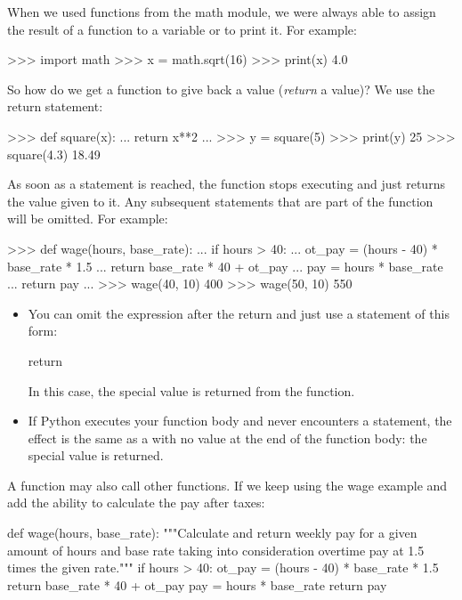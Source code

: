 \documentclass[11pt]{cselabheader}
\begin{document}
{When we used functions from the math module, we were always able to assign the
result of a function to a variable or to print it. For example:

\begin{pyconcode}
>>> import math
>>> x = math.sqrt(16)
>>> print(x)
4.0
\end{pyconcode}

So how do we get a function to give back a value (\emph{return} a value)? We use
the return statement:

\begin{pyconcode}
>>> def square(x):
...     return x**2
...
>>> y = square(5)
>>> print(y)
25
>>> square(4.3)
18.49
\end{pyconcode}

As soon as a  statement is reached, the function stops
executing and just returns the value given to it. Any subsequent statements that
are part of the function will be omitted. For example:

\begin{pyconcode}
>>> def wage(hours, base_rate):
...     if hours > 40:
...         ot_pay = (hours - 40) * base_rate * 1.5
...         return base_rate * 40 + ot_pay
...     pay = hours * base_rate
...     return pay
...
>>> wage(40, 10)
400
>>> wage(50, 10)
550
\end{pyconcode}

\begin{itemize}
  \item You can omit the expression after the return and just use a statement of
    this form:

    \begin{python3code}
return
    \end{python3code}

    In this case, the special value  is returned from the
    function.

  \item If Python executes your function body and never encounters a
     statement, the effect is the same as a
     with no value at the end of the function body: the
    special value  is returned.
\end{itemize}

A function may also call other functions. If we keep using the wage example and
add the ability to calculate the pay after taxes:

\begin{python3code}
def wage(hours, base_rate):
    """Calculate and return weekly pay for a given amount of hours and base rate taking
    into consideration overtime pay at 1.5 times the given rate."""
    if hours > 40:
        ot_pay = (hours - 40) * base_rate * 1.5
        return base_rate * 40 + ot_pay
    pay = hours * base_rate
    return pay


\end{python3code}}
\end{document}
